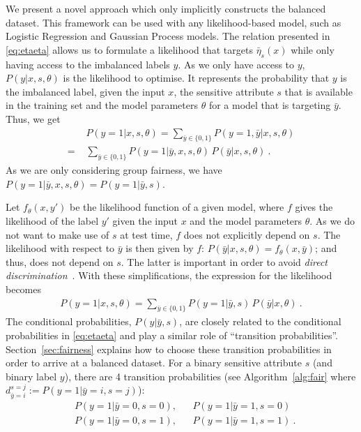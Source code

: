 We present a novel approach which only implicitly constructs the balanced dataset.
This framework can be used with any likelihood-based model, such as Logistic Regression and Gaussian Process models.
The relation presented in \eqref{eq:etaeta} allows us to formulate a likelihood
that targets $\bar{\eta}_s(x)$ while only having access to the imbalanced labels $y$.
As we only have access to $y$, $P(y|x,s,\theta)$ is the likelihood to optimise.
It represents the probability that $y$ is the imbalanced label,
given the input $x$, the sensitive attribute $s$ that is available in the training set
and the model parameters $\theta$ for a model that is targeting $\bar{y}$.
Thus, we get
\begin{align}
  &P(y=1|x, s, \theta)
  = \sum\limits_{\bar{y}\in \{0, 1\}} P(y=1,\bar{y}|x, s, \theta) \nonumber\\
  =\,\, &\sum\limits_{\bar{y}\in \{0, 1\}} P(y=1|\bar{y}, x, s, \theta)\,P(\bar{y}|x, s, \theta) \label{eq:lik}~.
\end{align}
As we are only considering group fairness, we have $P(y=1|\bar{y}, x, s, \theta)=P(y=1|\bar{y}, s)$.

Let $f_\theta(x, y\prime)$ be the likelihood function of a given model,
where $f$ gives the likelihood of the label $y\prime$ given the input $x$ and the model parameters $\theta$.
As we do not want to make use of $s$ at test time, $f$ does not explicitly depend on $s$.
The likelihood with respect to $\bar{y}$ is then given by $f$: $P(\bar{y}|x, s, \theta) = f_\theta(x, \bar{y})$;
and thus, does not depend on $s$. %
The latter is important in order to avoid \emph{direct discrimination}~\citep{BarSel16}.
With these simplifications, the expression for the likelihood becomes
\begin{align}
  P(y=1|x, s, \theta)
  =\sum\limits_{\bar{y}\in \{0, 1\}} P(y=1|\bar{y}, s)\,P(\bar{y}|x, \theta) \label{eq:lik2}~.
\end{align}
The conditional probabilities, $P(y|\bar{y}, s)$, are closely related to the conditional probabilities in \eqref{eq:etaeta}
and play a similar role of ``transition probabilities''.
Section~\ref{sec:fairness} explains how to choose these transition probabilities in order to arrive at a balanced dataset.
For a binary sensitive attribute $s$ (and binary label $y$), there are 4 transition probabilities
(see Algorithm~\ref{alg:fair} where $d^{s=j}_{\bar{y}=i} := P(y=1|\bar{y}=i, s=j)$):
\begin{align}
  &P(y=1|\bar{y}=0, s=0),  &&P(y=1|\bar{y}=1, s=0) \label{eq:par1}\\
  &P(y=1|\bar{y}=0, s=1),  &&P(y=1|\bar{y}=1, s=1) \label{eq:par4}~.
\end{align}

